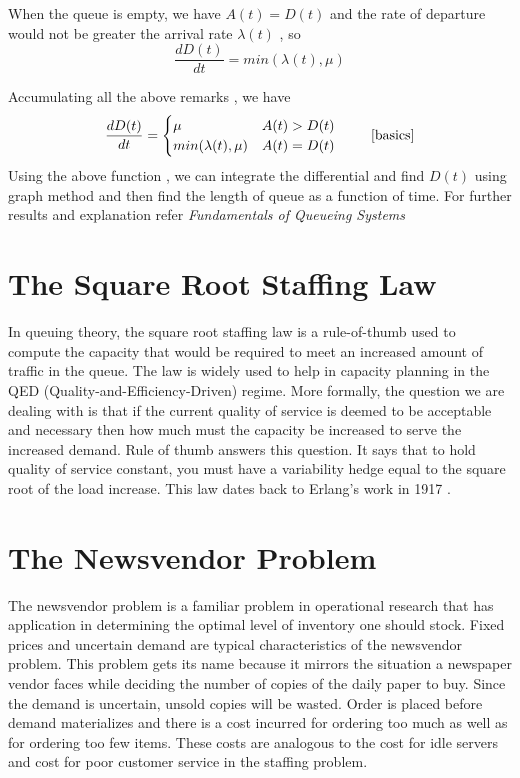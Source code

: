  \begin{remark}
 When the queue is empty, we have $A(t)=D(t)$ and the rate of departure would not be greater the arrival rate $\lambda(t)$ , so $$\frac{dD(t)}{dt} = min(\lambda(t),\mu)$$
 \end{remark}
 Accumulating all the above remarks , we have
 $$
 \frac{dD(t)}{dt} =
   \begin{cases} 
      \mu & A(t)>D(t) \\
      min(\lambda(t),\mu) & A(t)=D(t)
   \end{cases}
\ \ \ \ \ \ \ \cite{basics}$$
Using the above function , we can integrate the differential and find $D(t)$ using graph method and then find the length of queue as a function of time. For further results and explanation refer \textit{Fundamentals of Queueing Systems}\cite{basics}
\section{The Square Root Staffing Law}
In queuing theory, the square root staffing law is a rule-of-thumb used to compute the capacity that would be required to meet an increased amount of traffic in the queue. The law is widely used to help in capacity planning in the QED (Quality-and-Efficiency-Driven) regime. More formally, the question we are dealing with is that if the current quality of service is deemed to be acceptable and necessary then how much must the capacity be increased to serve the increased demand. Rule of thumb answers this question. It says that to hold quality of service constant, you must have a variability hedge equal to the square root of the load increase. This law dates back to Erlang's work in 1917 \cite{erlang}.

\section{The Newsvendor Problem}
The newsvendor problem is a familiar problem in operational research that has application in determining the optimal level of inventory one should stock. Fixed prices and uncertain demand are typical characteristics of the newsvendor problem. This problem gets its name because it mirrors the situation a newspaper vendor faces while deciding the number of copies of the daily paper to buy. Since the demand is uncertain, unsold copies will be wasted. Order is placed before demand materializes and there is a cost incurred for ordering too much as well as for ordering too few items. These costs are analogous to the cost for idle servers and cost for poor customer service in the staffing problem. 

